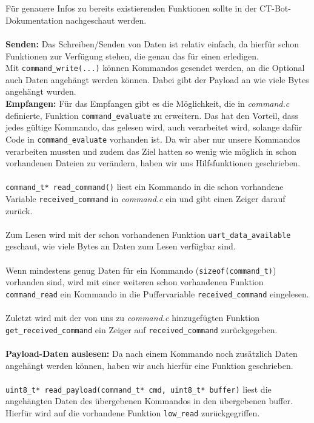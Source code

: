  \newpage


 \\
\\
Für genauere Infos zu bereits existierenden Funktionen sollte in der CT-Bot-Dokumentation nachgeschaut werden.\\
\\
\textbf{Senden:} Das Schreiben/Senden von Daten ist relativ einfach, da hierfür schon Funktionen zur Verfügung stehen, die genau das für einen erledigen.\\
Mit \verb|command_write(...)| können Kommandos gesendet werden, an die Optional auch Daten angehängt werden können. Dabei gibt der Payload an wie viele Bytes angehängt wurden. 
\\
\textbf{Empfangen:} Für das Empfangen gibt es die Möglichkeit, die in \textit{command.c} definierte, Funktion \verb|command_evaluate| zu erweitern. Das hat den Vorteil, dass jedes gültige Kommando, das gelesen wird, auch verarbeitet wird, solange dafür Code in \verb|command_evaluate| vorhanden ist.
Da wir aber nur unsere Kommandos verarbeiten mussten und zudem das Ziel hatten so wenig wie möglich in schon vorhandenen Dateien zu verändern, haben wir uns Hilfsfunktionen geschrieben.\\
\\
\verb|command_t* read_command()| liest ein Kommando in die schon vorhandene Variable \verb|received_command| in \textit{command.c} ein und gibt einen Zeiger darauf zurück.\\
\\
Zum Lesen wird mit der schon vorhandenen Funktion \verb|uart_data_available| geschaut, wie viele Bytes an Daten zum Lesen verfügbar sind.\\
\\
Wenn mindestens genug Daten für ein Kommando (\verb|sizeof(command_t)|) vorhanden sind, wird mit einer weiteren schon vorhandenen Funktion \verb|command_read| ein Kommando in die Puffervariable \verb|received_command| eingelesen.\\
\\
Zuletzt wird mit der von uns zu \textit{command.c} hinzugefügten Funktion \\ \verb|get_received_command| ein Zeiger auf \verb|received_command| zurückgegeben.\\
\\
\textbf{Payload-Daten auslesen:} Da nach einem Kommando noch zusätzlich Daten angehängt werden können, haben wir auch hierfür eine Funktion geschrieben.\\
\\
\verb|uint8_t* read_payload(command_t* cmd, uint8_t* buffer)| liest die angehängten Daten des übergebenen Kommandos in den übergebenen buffer.\\ Hierfür wird auf die vorhandene Funktion \verb|low_read| zurückgegriffen.

